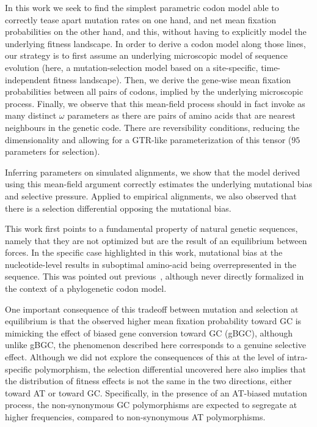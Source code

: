 In this work we seek to find the simplest parametric \gls{codon} model able to correctly tease apart mutation rates on one hand, and net mean fixation probabilities on the other hand, and this, without having to explicitly model the underlying fitness landscape.
In order to derive a \gls{codon} model along those lines, our strategy is to first assume an underlying microscopic model of sequence evolution (here, a mutation-selection model based on a site-specific, time-independent fitness landscape).
Then, we derive the gene-wise mean fixation probabilities between all pairs of \glspl{codon}, implied by the underlying microscopic process.
Finally, we observe that this mean-field process should in fact invoke as many distinct $\omega$ parameters as there are pairs of amino acids that are nearest neighbours in the genetic code.
There are reversibility conditions, reducing the dimensionality and allowing for a GTR-like parameterization of this tensor ($95$ parameters for selection).

Inferring parameters on simulated alignments, we show that the model derived using this mean-field argument correctly estimates the underlying mutational bias and selective pressure.
Applied to empirical alignments, we also observed that there is a selection differential opposing the mutational bias.

This work first points to a fundamental property of natural genetic sequences, namely that they are not optimized but are the result of an equilibrium between forces.
In the specific case highlighted in this work, mutational bias at the nucleotide-level results in suboptimal amino-acid being overrepresented in the sequence.
This was pointed out previous~\citep{Singer2000}, although never directly formalized in the context of a phylogenetic \gls{codon} model.

One important consequence of this tradeoff between mutation and selection at equilibrium is that the observed higher mean fixation probability toward GC is mimicking the effect of biased gene conversion toward GC (\acrshort{gBGC}), although unlike \acrshort{gBGC}, the phenomenon described here corresponds to a genuine selective effect.
Although we did not explore the consequences of this at the level of intra-specific polymorphism, the selection differential uncovered here also implies that the distribution of fitness effects is not the same in the two directions, either toward AT or toward GC.
Specifically, in the presence of an AT-biased mutation process, the \gls{non-synonymous} GC polymorphisms are expected to segregate at higher frequencies, compared to \gls{non-synonymous} AT polymorphisms.

